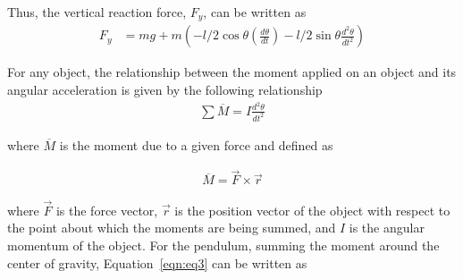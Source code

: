 \documentclass{notes}
\begin{document}
 Thus, the vertical reaction force, $F_y$, can be written as
 \begin{align*}
   F_y & = mg + m\left(-l/2\cos\theta\left(\frac{d\theta}{dt}\right) - l/2\sin\theta\frac{d^2\theta}{dt^2}\right)
 \end{align*}
 
 For any object, the relationship between the moment applied on an object and its angular acceleration is given by the following relationship
 \begin{align}
   \sum \overline{M} = I\frac{d^2\theta}{dt^2}\label{eqn:eq3}
 \end{align}
 
 where $\overline{M}$ is the moment due to a given force and defined as 
 
 \begin{align*}
   \overline{M} = \vec{F} \times \vec{r}
 \end{align*}
 
 where $\vec{F}$ is the force vector, $\vec{r}$ is the position vector of the object with respect to the point about which the moments are being summed, and $I$ is the angular momentum of the object. For the pendulum, summing the moment around the center of gravity, Equation~\ref{eqn:eq3} can be written as
\end{document}

